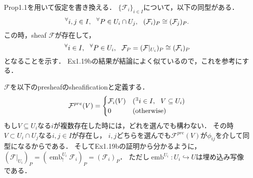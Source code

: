 \documentclass[a4paper]{jsarticle}
\newcommand{\shF}{\mathcal{F}}
\newcommand{\emb}{\operatorname{emb}}
\begin{document}
    Prop1.1を用いて仮定を書き換える．
    $\{\shF_i\}_{i \in I}$について，以下の同型がある．
    \[ \Forall{i,j \in I} \Forall{P \in U_i \cap U_j} (\shF_i)_P \cong (\shF_j)_P. \]
    この時，sheaf $\shF$が存在して，
    \[ \Forall{i \in I} \Forall{P \in U_i} \shF_P=(\shF|_{U_i})_P \cong (\shF_i)_P \]
    となることを示す．
    Ex1.19bの結果が結論によく似ているので，これを参考にする．

    $\shF$を以下のpresheafのsheafificationと定義する．
    \[
        \shF^{pre}(V)=
        \begin{cases}{}
            \shF_i(V) & (\Exists{i \in I} V \subseteq U_i) \\
            0 & (\text{otherwise})
        \end{cases}
    \]
    もし$V \subseteq U_i$なる$i$が複数存在した時には，どれを選んでも構わない．
    その時$V \subset U_i \cap U_j$なる$i,j \in I$が存在し，
    $i,j$どちらを選んでも$\shF^{pre}(V)$が$\phi_{ij}$を介して同型になるからである．
    そしてEx1.19bの証明から分かるように，$(\shF|_{U_i})_P=(\emb^{U_i}_! \shF_i)_P=(\shF_i)_P$．
    ただし$\emb^{U_i}: U_i \hookrightarrow U$は埋め込み写像である．
\end{document}
